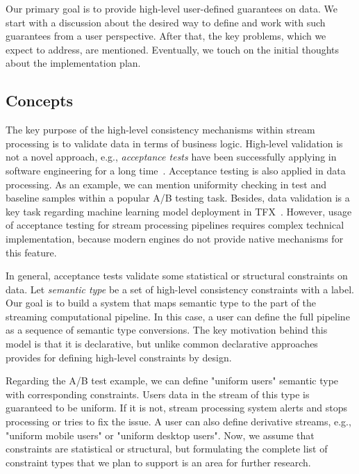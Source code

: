 \label{fs-phd-reliable}

Our primary goal is to provide high-level user-defined guarantees on data. We start with a discussion about the desired way to define and work with such guarantees from a user perspective. After that, the key problems, which we expect to address, are mentioned. Eventually, we touch on the initial thoughts about the implementation plan.

\subsection{Concepts}

The key purpose of the high-level consistency mechanisms within stream processing is to validate data in terms of business logic. High-level validation is not a novel approach, e.g., {\em acceptance tests} have been successfully applying in software engineering for a long time~\cite{hambling2013user}. Acceptance testing is also applied in data processing. As an example, we can mention uniformity checking in test and baseline samples within a popular A/B testing task. Besides, data validation is a key task regarding machine learning model deployment in TFX~\cite{Baylor:2017:TTP:3097983.3098021}. However, usage of acceptance testing for stream processing pipelines requires complex technical implementation, because modern engines do not provide native mechanisms for this feature.  

In general, acceptance tests validate some statistical or structural constraints on data. Let {\em semantic type} be a set of high-level consistency constraints with a label. Our goal is to build a system that maps semantic type to the part of the streaming computational pipeline. In this case, a user can define the full pipeline as a sequence of semantic type conversions. The key motivation behind this model is that it is declarative, but unlike common declarative approaches provides for defining high-level constraints by design.          

Regarding the A/B test example, we can define "uniform users" semantic type with corresponding constraints. Users data in the stream of this type is guaranteed to be uniform. If it is not, stream processing system alerts and stops processing or tries to fix the issue. A user can also define derivative streams, e.g., "uniform mobile users" or "uniform desktop users". Now, we assume that constraints are statistical or structural, but formulating the complete list of constraint types that we plan to support is an area for further research. 

